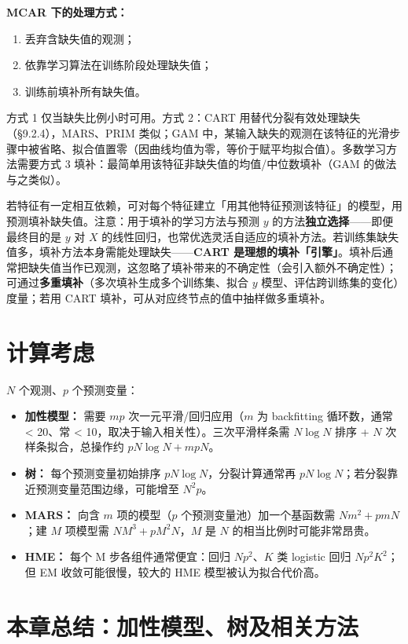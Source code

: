 \textbf{MCAR 下的处理方式：}
\begin{enumerate}
    \item 丢弃含缺失值的观测；
    \item 依靠学习算法在训练阶段处理缺失值；
    \item 训练前填补所有缺失值。
\end{enumerate}
方式 1 仅当缺失比例小时可用。方式 2：CART 用替代分裂有效处理缺失（§9.2.4），MARS、PRIM 类似；GAM 中，某输入缺失的观测在该特征的光滑步骤中被省略、拟合值置零（因曲线均值为零，等价于赋平均拟合值）。多数学习方法需要方式 3 填补：最简单用该特征非缺失值的均值/中位数填补（GAM 的做法与之类似）。

若特征有一定相互依赖，可对每个特征建立「用其他特征预测该特征」的模型，用预测填补缺失值。注意：用于填补的学习方法与预测 $y$ 的方法\textbf{独立选择}——即便最终目的是 $y$ 对 $X$ 的线性回归，也常优选灵活自适应的填补方法。若训练集缺失值多，填补方法本身需能处理缺失——\textbf{CART 是理想的填补「引擎」}。填补后通常把缺失值当作已观测，这忽略了填补带来的不确定性（会引入额外不确定性）；可通过\textbf{多重填补}（多次填补生成多个训练集、拟合 $y$ 模型、评估跨训练集的变化）度量；若用 CART 填补，可从对应终节点的值中抽样做多重填补。

\section{计算考虑}

$N$ 个观测、$p$ 个预测变量：
\begin{itemize}
    \item \textbf{加性模型：} 需要 $mp$ 次一元平滑/回归应用（$m$ 为 backfitting 循环数，通常 < 20、常 < 10，取决于输入相关性）。三次平滑样条需 $N\log N$ 排序 + $N$ 次样条拟合，总操作约 $pN\log N + mpN$。
    \item \textbf{树：} 每个预测变量初始排序 $pN\log N$，分裂计算通常再 $pN\log N$；若分裂靠近预测变量范围边缘，可能增至 $N^2p$。
    \item \textbf{MARS：} 向含 $m$ 项的模型（$p$ 个预测变量池）加一个基函数需 $Nm^2 + pmN$；建 $M$ 项模型需 $NM^3 + pM^2N$，$M$ 是 $N$ 的相当比例时可能非常昂贵。
    \item \textbf{HME：} 每个 M 步各组件通常便宜：回归 $Np^2$、$K$ 类 logistic 回归 $Np^2K^2$；但 EM 收敛可能很慢，较大的 HME 模型被认为拟合代价高。
\end{itemize}

\section{本章总结：加性模型、树及相关方法}

